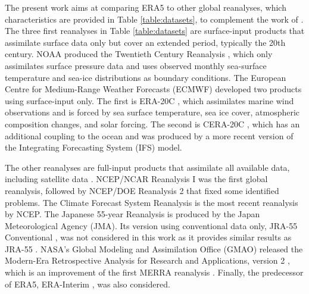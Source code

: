 \documentclass[alpha-refs]{wiley-article}
\begin{document}
The present work aims at comparing ERA5 \citep{Hersbach2019} to other global reanalyses, which characteristics are provided in Table \ref{table:datasets}, to complement the work of \citet{Horton2018b}. The three first reanalyses in Table \ref{table:datasets} are surface-input \citep{Fujiwara2017} products that assimilate surface data only but cover an extended period, typically the 20th century. NOAA produced the Twentieth Century Reanalysis \citep[version 2c, 20CR-2c --][]{Compo2011}, which only assimilates surface pressure data and uses observed monthly sea-surface temperature and sea-ice distributions as boundary conditions. The European Centre for Medium-Range Weather Forecasts (ECMWF) developed two products using surface-input only. The first is ERA-20C \citep{Poli2016}, which assimilates marine wind observations and is forced by sea surface temperature, sea ice cover, atmospheric composition changes, and solar forcing. The second is CERA-20C \citep{Laloyaux2018a}, which has an additional coupling to the ocean and was produced by a more recent version of the Integrating Forecasting System (IFS) model.

The other reanalyses are full-input products that assimilate all available data, including satellite data \citep{Fujiwara2017}. NCEP/NCAR Reanalysis I \citep[NR-1 --][]{Kalnay1996, Kistler2001} was the first global reanalysis, followed by NCEP/DOE Reanalysis 2 \citep[NR-2 --][]{Kanamitsu2002} that fixed some identified problems. The Climate Forecast System Reanalysis \citep[CFSR --][]{Saha2010a} is the most recent reanalysis by NCEP. The Japanese 55-year Reanalysis \citep[JRA-55 --][]{Kobayashi2015, Harada2016} is produced by the Japan Meteorological Agency (JMA). Its version using conventional data only, JRA-55 Conventional \citep[JRA-55C --][]{Kobayashi2014}, was not considered in this work as it provides similar results as JRA-55 \citep{Horton2018b}. NASA's Global Modeling and Assimilation Office (GMAO) released the Modern-Era Retrospective Analysis for Research and Applications, version 2 \citep[MERRA-2 -- ][]{Gelaro2017}, which is an improvement of the first MERRA reanalysis \citep{Rienecker2011}. Finally, the predecessor of ERA5, ERA-Interim \citep[ERA-INT --][]{Dee2011a}, was also considered.
\end{document}
